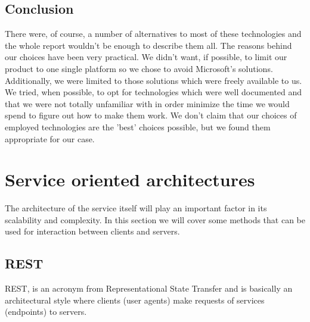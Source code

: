 \subsection{Conclusion}

There were, of course, a number of alternatives to most of these technologies and the whole
report wouldn't be enough to describe them all. The reasons behind our choices have been very practical.
We didn't want, if possible, to limit our product to one single platform so we chose to avoid Microsoft's solutions.
Additionally, we were limited to those solutions which were freely available to us.
We tried, when possible, to opt for technologies which were well documented and that we were not
totally unfamiliar with in order minimize the time we would spend to figure out how to make them work.
We don't claim that our choices of employed technologies are the 'best' choices possible,
but we found them appropriate for our case.

\section{Service oriented architectures}

The architecture of the service itself will play an important factor in its scalability and complexity.
In this section we will cover some methods that can be used for interaction between clients and servers. 

\subsection{REST}\cite{REST}
\label{subsec:rest}

REST, is an acronym from Representational State Transfer and is basically an architectural style where clients
(user agents) make requests of services (endpoints) to servers.

